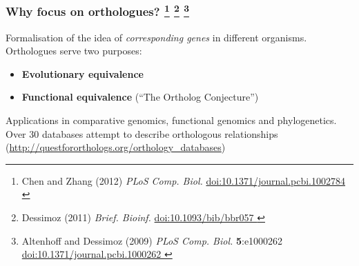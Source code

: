 
% 
\begin{frame}
  \frametitle{Why focus on orthologues?
    \footnote{\tiny{Chen and Zhang (2012) \textit{PLoS Comp. Biol.} \href{http://dx.doi.org/10.1371/journal.pcbi.1002784}{doi:10.1371/journal.pcbi.1002784
    }}}  
    \footnote{\tiny{Dessimoz (2011) \textit{Brief. Bioinf.} \href{http://dx.doi.org/10.1093/bib/bbr057}{doi:10.1093/bib/bbr057
    }}}
    \footnote{\tiny{Altenhoff and Dessimoz (2009) \textit{PLoS Comp. Biol.} \textbf{5}:e1000262 \href{http://dx.doi.org/10.1371/journal.pcbi.1000262}{doi:10.1371/journal.pcbi.1000262
    }}}
  }
  Formalisation of the idea of \textit{corresponding genes} in different organisms. \\
  \textcolor{hutton_blue}{Orthologues serve two purposes:}
  \begin{itemize}
    \item \textcolor{hutton_green}{\textbf{Evolutionary equivalence}}
    \item \textcolor{hutton_purple}{\textbf{Functional equivalence}} (``The Ortholog Conjecture'')
  \end{itemize}
  Applications in comparative genomics, functional genomics and phylogenetics. \\
  \textcolor{RawSienna}{Over 30 databases attempt to describe orthologous relationships} (\href{http://questfororthologs.org/orthology_databases
}{http://questfororthologs.org/orthology\_databases})
\end{frame}

